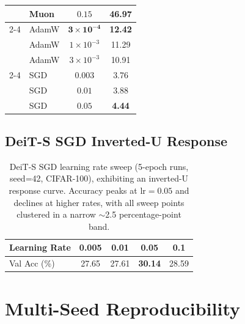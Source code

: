 \begin{table}[h]
\begin{tabular}{llcc}
 & Muon & $0.15$ & 46.97 \\
\cmidrule(lr){2-4}
 & AdamW & $\mathbf{3 \times 10^{-4}}$ & \textbf{12.42} \\
 & AdamW & $1 \times 10^{-3}$ & 11.29 \\
 & AdamW & $3 \times 10^{-3}$ & 10.91 \\
\cmidrule(lr){2-4}
 & SGD & $0.003$ & 3.76 \\
 & SGD & $0.01$ & 3.88 \\
 & SGD & $\mathbf{0.05}$ & \textbf{4.44} \\
\bottomrule
\end{tabular}
\end{table}

\subsection{DeiT-S SGD Inverted-U Response}

\begin{table}[h]
\centering
\caption{DeiT-S SGD learning rate sweep (5-epoch runs, seed=42, CIFAR-100), exhibiting an inverted-U response curve. Accuracy peaks at $\text{lr}=0.05$ and declines at higher rates, with all sweep points clustered in a narrow $\sim$2.5 percentage-point band.}
\label{tab:deit_sgd_sweep}
\begin{tabular}{lcccc}
\toprule
Learning Rate & 0.005 & 0.01 & 0.05 & 0.1 \\
\midrule
Val Acc (\%) & 27.65 & 27.61 & \textbf{30.14} & 28.59 \\
\bottomrule
\end{tabular}
\end{table}

\section{Multi-Seed Reproducibility}\label{sec:multi_seed}

